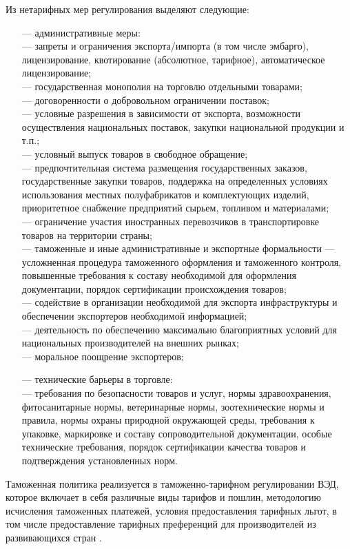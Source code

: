 Из нетарифных мер регулирования выделяют следующие:
\begin{enumerate}
	\item [---] административные меры:\\
	--- запреты и ограничения экспорта/импорта (в том числе эмбарго), лицензирование, квотирование (абсолютное, тарифное), автоматическое лицензирование;\\
	--- государственная монополия на торговлю отдельными товарами;\\
	--- договоренности о добровольном ограничении поставок;\\
	--- условные разрешения в зависимости от экспорта, возможности осуществления национальных поставок, закупки национальной продукции и т.п.;\\
	--- условный выпуск товаров  в свободное обращение;\\
	--- предпочтительная система размещения государственных заказов, государственные закупки товаров, поддержка на определенных условиях использования местных полуфабрикатов и комплектующих изделий, приоритетное снабжение предприятий сырьем, топливом и материалами;\\
	--- ограничение участия иностранных перевозчиков в транспортировке товаров на территории страны;\\
	--- таможенные и иные административные и экспортные формальности --- усложненная процедура таможенного оформления и таможенного контроля, повышенные требования к составу необходимой для оформления документации, порядок сертификации происхождения товаров;\\
	--- содействие в организации необходимой для экспорта инфраструктуры и обеспечении экспортеров необходимой информацией;\\
	--- деятельность по обеспечению максимально благоприятных условий для национальных производителей на внешних рынках;\\
	---  моральное поощрение экспортеров;
	\item [---] технические барьеры в торговле:\\
	--- требования по безопасности товаров  и услуг, нормы здравоохранения, фитосанитарные нормы, ветеринарные нормы, зоотехнические нормы и правила, нормы охраны природной окружающей среды, требования к упаковке, маркировке и составу сопроводительной документации, особые технические требования, порядок сертификации качества товаров и подтверждения установленных норм.
\end{enumerate}

Таможенная политика реализуется в таможенно-тарифном регулировании ВЭД, которое включает в себя различные виды тарифов и пошлин, методологию исчисления таможенных платежей, условия предоставления тарифных льгот, в том числе предоставление тарифных преференций для производителей из развивающихся стран \cite[с. 25--30]{geraschenko}.






